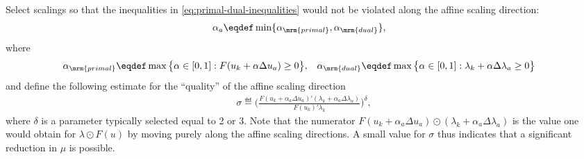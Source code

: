 \documentclass[11pt]{article}
\begin{document}
\begin{algorithm}
\begin{steps}
\item Select scalings so that the inequalities in
  \eqref{eq:primal-dual-inequalities} would not be violated along the
  affine scaling direction:
  \begin{align*}
    \alpha_a&\eqdef\min\{\alpha_\mrm{primal},\alpha_\mrm{dual}\}, 
  \end{align*}
  where
  \begin{align*}
    \alpha_\mrm{primal}&\eqdef \max\big\{\alpha\in[0,1]:F(u_k+\alpha \Delta u_a)\ge 0\big\}, &
    \alpha_\mrm{dual}&\eqdef \max\big\{\alpha\in[0,1]:\lambda_k+\alpha \Delta\lambda_a\ge 0 \big\}
  \end{align*}
  and define the following estimate for the ``quality'' of the affine
  scaling direction
  \begin{align*}
    \sigma\eqdef\Big(\frac{F(u_k+\alpha_a \Delta u_a)'(\lambda_k+\alpha_a \Delta\lambda_a)}{F(u_k)'\lambda_k}\Big)^\delta,
  \end{align*}
  where $\delta$ is a parameter typically selected equal to 2 or 3. Note that
  the numerator $F(u_k+\alpha_a \Delta u_a)\odot(\lambda_k+\alpha_a
  \Delta\lambda_a)$ is the value one would obtain for $\lambda\odot F(u)$ by moving
  purely along the affine scaling directions. A small value for $\sigma$
  thus indicates that a significant reduction in $\mu$ is possible.


\end{steps}
\end{algorithm}
\end{document}
